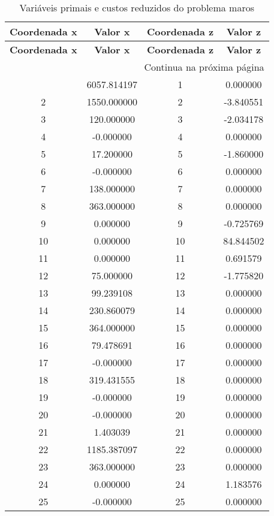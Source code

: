 \documentclass[12pt]{article}
\begin{document}
\begin{longtable}{@{}cccc@{}}
\caption{Variáveis primais e custos reduzidos do problema maros} \\
\toprule
\textbf{Coordenada x} & \textbf{Valor x} & \textbf{Coordenada z} & \textbf{Valor z} \\
\midrule
\endfirsthead

\toprule
\textbf{Coordenada x} & \textbf{Valor x} & \textbf{Coordenada z} & \textbf{Valor z} \\
\midrule
\endhead

\midrule \multicolumn{4}{r}{{Continua na próxima página}} \\ \midrule
\endfoot

\bottomrule
\endlastfoot
1 & 6057.814197 & 1 & 0.000000 \\
2 & 1550.000000 & 2 & -3.840551 \\
3 & 120.000000 & 3 & -2.034178 \\
4 & -0.000000 & 4 & 0.000000 \\
5 & 17.200000 & 5 & -1.860000 \\
6 & -0.000000 & 6 & 0.000000 \\
7 & 138.000000 & 7 & 0.000000 \\
8 & 363.000000 & 8 & 0.000000 \\
9 & 0.000000 & 9 & -0.725769 \\
10 & 0.000000 & 10 & 84.844502 \\
11 & 0.000000 & 11 & 0.691579 \\
12 & 75.000000 & 12 & -1.775820 \\
13 & 99.239108 & 13 & 0.000000 \\
14 & 230.860079 & 14 & 0.000000 \\
15 & 364.000000 & 15 & 0.000000 \\
16 & 79.478691 & 16 & 0.000000 \\
17 & -0.000000 & 17 & 0.000000 \\
18 & 319.431555 & 18 & 0.000000 \\
19 & -0.000000 & 19 & 0.000000 \\
20 & -0.000000 & 20 & 0.000000 \\
21 & 1.403039 & 21 & 0.000000 \\
22 & 1185.387097 & 22 & 0.000000 \\
23 & 363.000000 & 23 & 0.000000 \\
24 & 0.000000 & 24 & 1.183576 \\
25 & -0.000000 & 25 & 0.000000 \\

\end{longtable}
\end{document}
